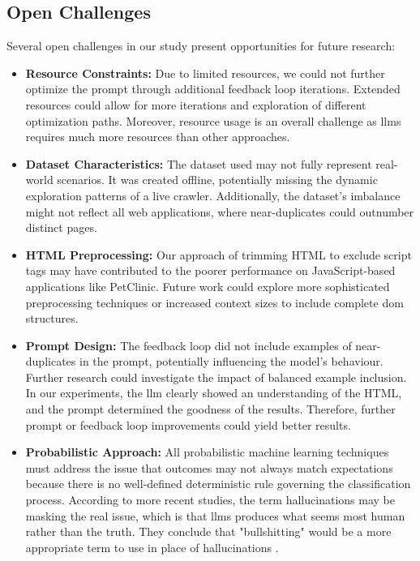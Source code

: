     \subsection{Open Challenges}
        Several open challenges in our study present opportunities for future research:
        \begin{itemize}
            \item \textbf{Resource Constraints:} Due to limited resources, we could not further optimize the prompt through additional feedback loop iterations. Extended resources could allow for more iterations and exploration of different optimization paths. Moreover, resource usage is an overall challenge as \acp{llm} requires much more resources than other approaches.
            
            \item \textbf{Dataset Characteristics:} The dataset used may not fully represent real-world scenarios. It was created offline, potentially missing the dynamic exploration patterns of a live crawler. Additionally, the dataset's imbalance might not reflect all web applications, where near-duplicates could outnumber distinct pages.
            
            \item \textbf{HTML Preprocessing:} Our approach of trimming HTML to exclude script tags may have contributed to the poorer performance on JavaScript-based applications like PetClinic. Future work could explore more sophisticated preprocessing techniques or increased context sizes to include complete \ac{dom} structures.
            
            \item \textbf{Prompt Design:} The feedback loop did not include examples of near-duplicates in the prompt, potentially influencing the model's behaviour. Further research could investigate the impact of balanced example inclusion. In our experiments, the \ac{llm} clearly showed an understanding of the HTML, and the prompt determined the goodness of the results. Therefore, further prompt or feedback loop improvements could yield better results.

            \item \textbf{Probabilistic Approach:} All probabilistic machine learning techniques must address the issue that outcomes may not always match expectations because there is no well-defined deterministic rule governing the classification process. According to more recent studies, the term hallucinations may be masking the real issue, which is that \acp{llm} produces what seems most human rather than the truth. They conclude that "bullshitting" would be a more appropriate term to use in place of hallucinations \cite{hicks_chatgpt_2024}. 
        \end{itemize}
        
